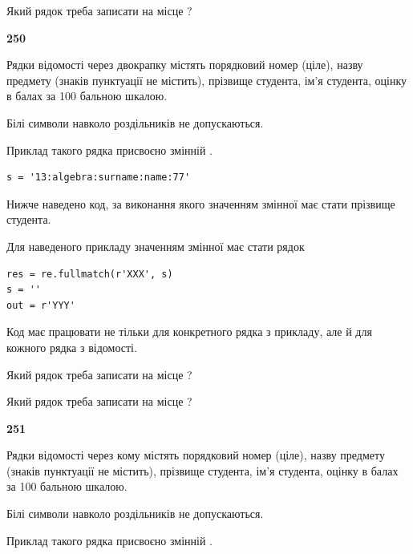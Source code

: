 Який рядок треба записати на місце  ?\par


\newpage

{\begin {center}\textbf{ 250}\end {center}}\par
Рядки відомості через двокрапку містять порядковий номер (ціле), назву предмету (знаків пунктуації не містить), прізвище студента, ім'я студента, оцінку в балах за 100 бальною шкалою.

Білі символи навколо роздільників не допускаються.

Приклад такого рядка присвоєно змінній .



\begin{verbatim}
s = '13:algebra:surname:name:77'
\end{verbatim}


Нижче наведено код, за виконання якого значенням змінної  має стати прізвище студента.

Для наведеного прикладу значенням змінної  має стати рядок 



\begin{verbatim}
res = re.fullmatch(r'XXX', s)
s = ''
out = r'YYY'
\end{verbatim}


Код має працювати не тільки для конкретного рядка з прикладу, але й для кожного рядка з відомості.




Який рядок треба записати на місце  ?\par
\vspace{5mm}


Який рядок треба записати на місце  ?\par


\newpage

{\begin {center}\textbf{ 251}\end {center}}\par
Рядки відомості через кому містять порядковий номер (ціле), назву предмету (зна\-ків пунктуації не містить), прізвище студента, ім'я студента, оцінку в балах за 100 бальною шкалою.

Білі символи навколо роздільників не допускаються.

Приклад такого рядка присвоєно змінній .



